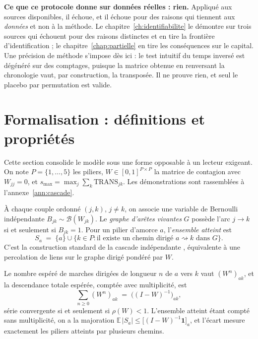 \begin{attention}
\textbf{Ce que ce protocole donne sur données réelles : rien.} Appliqué aux sources
disponibles, il échoue, et il échoue pour des raisons qui tiennent aux \emph{données} et non à
la méthode. Le chapitre~\ref{ch:identifiabilite} le démontre sur trois sources qui échouent pour
des raisons distinctes et en tire la frontière d'identification ; le
chapitre~\ref{chap:partielle} en tire les conséquences sur le capital. Une précision de méthode
s'impose dès ici : le test intuitif du \og temps inversé \fg{} est dégénéré
sur des comptages, puisque la matrice obtenue en renversant la chronologie vaut, par
construction, la transposée. Il ne prouve rien, et seul le placebo par permutation est valide.
\end{attention}


\section{Formalisation : définitions et propriétés}
\label{sec:formalisation}

Cette section consolide le modèle sous une forme opposable à un lecteur exigeant. On note
$P=\{1,\dots,5\}$ les piliers, $W\in[0,1]^{P\times P}$ la matrice de contagion avec
$W_{jj}=0$, et $s_{\max}=\max_j\sum_k \mathrm{TRANS}_{jk}$. Les démonstrations sont
rassemblées à l'annexe~\ref{ann:cascade}.

\begin{definition}
\label{def:cascade}
À chaque couple ordonné $(j,k)$, $j\neq k$, on associe une variable de Bernoulli
indépendante $B_{jk}\sim\mathcal B(W_{jk})$. Le \emph{graphe d'arêtes vivantes} $G$ possède
l'arc $j\to k$ si et seulement si $B_{jk}=1$. Pour un pilier d'amorce $a$, l'\emph{ensemble
atteint} est
\[
  S_a \;=\; \{a\}\cup\{k\in P : \text{il existe un chemin dirigé } a\rightsquigarrow k \text{ dans } G\}.
\]
C'est la construction standard de la cascade indépendante \citep{kempe2003}, équivalente à une percolation
de liens sur le graphe dirigé pondéré par $W$.
\end{definition}

\begin{proposition}
\label{prop:reduite}
Le nombre espéré de marches dirigées de longueur $n$ de $a$ vers $k$ vaut $(W^n)_{ak}$, et la
descendance totale espérée, comptée avec multiplicité, est
\[
  \sum_{n\ge 0}(W^n)_{ak} \;=\; \bigl((I-W)^{-1}\bigr)_{ak},
\]
série convergente si et seulement si $\rho(W)<1$. L'ensemble atteint étant compté sans
multiplicité, on a la majoration $\mathbb E\,|S_a|\le \bigl[(I-W)^{-1}\mathbf 1\bigr]_a$, et
l'écart mesure exactement les piliers atteints par plusieurs chemins.
\end{proposition}

